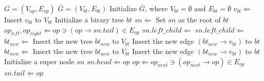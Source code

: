 \begin{algorithm}[ht!]    \caption{}
    \begin{algorithmic}[1]
        \Require    $G = ( V_{op} , E_{op} )$ 
        \Ensure     $\bar{G} = ( V_{bt} , E_{bt} )$ 
        \State      Initialize $\bar{G} \textrm{, where } V_{bt} = \emptyset \textrm{ and } E_{bt} = \emptyset $
          \label{line:forroots}   
        \State      $v_{bt} \Leftarrow $
        \State      Insert $v_{bt}$ to $V_{bt}$
        \EndFor                                                                    \label{line:forroote}
        \Statex %
                 \label{line:bbts}
        \State      Initialize a birary tree $bt$
        \State      $sn \Leftarrow$ 
        \State      Set $sn$ as the root of $bt$
        \State      {}
        \State      {}
        \EndFunction                                \label{line:bbte}
        \Statex %
                  \label{line:gbts}
             
        \State      $op_{left}, op_{right} \Leftarrow op \ni (op \rightarrow sn.tail) \in E_{op}$ 
          \label{line:deg}  \label{line:growifs}
        \State      $sn.left\_child \Leftarrow$ 
        \State      {}
        \State      $sn.left\_child \Leftarrow$ 
        \State      {}     \label{line:growife}
        \Else       \label{line:growelses}
        \State      $bt_{new} \Leftarrow$ 
        \State      Insert the new tree $bt_{new}$ to $V_{bt}$
        \State      Insert the new edge $(bt_{new} \rightarrow v_{bt})$ to $bt$
        \State      $bt_{new} \Leftarrow$ 
        \State      Insert the new tree $bt_{new}$ to $V_{bt}$
        \State      Insert the new edge $(bt_{new} \rightarrow v_{bt})$ to $bt$ \label{line:growelsee}
        \EndIf                          \label{line:gbte}
        \EndIf
        \EndFunction
        \Statex %
          \label{line:bsns}
        \State  Initialize a super node $sn$ 
        \State  $sn.head \Leftarrow op$
        \State   $op \Leftarrow op_{next} \ni (op_{next} \rightarrow op) \in E_{op}$ 
        \EndWhile
        \State  $sn.tail \Leftarrow op$
        \State      {}
        \EndFunction                        \label{line:bsne}
    \end{algorithmic}
    \label{alg:tohdfg}
\end{algorithm}
